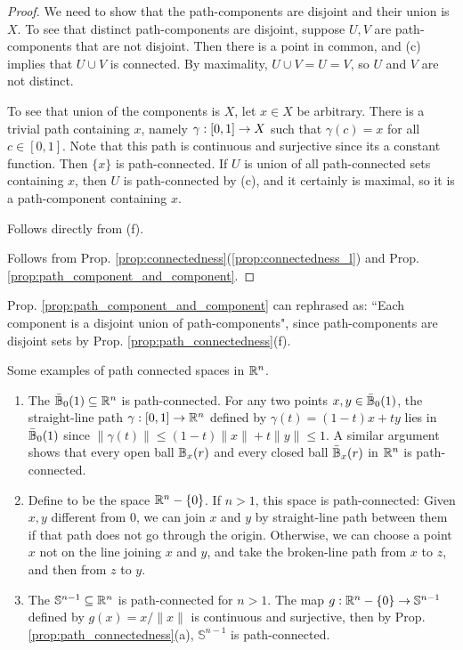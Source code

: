 \documentclass[11pt,a4paper]{article}
\begin{document}
\begin{proof}
 We need to show that the path-components are disjoint and their union is $X$. To see that distinct path-components are disjoint, suppose $U, V$ are path-components that are not disjoint. Then there is a point in common, and (c) implies that $U\cup V$ is connected. By maximality, $U\cup V = U = V$, so $U$ and $V$ are not distinct.

To see that union of the components is $X$, let $x\in X$ be arbitrary. There is a trivial path containing $x$, namely $\gamma:[0,1]\rightarrow X$ such that $\gamma(c) = x$ for all $c\in [0,1]$. Note that this path is continuous and surjective since its a constant function. Then $\{x\}$ is path-connected. If $U$ is union of all path-connected sets containing $x$, then $U$ is path-connected by (c), and it certainly is maximal, so it is a path-component containing $x$.

 Follows directly from (f).

 Follows from Prop. \ref{prop:connectedness}(\ref{prop:connectedness_l}) and Prop. \ref{prop:path_component_and_component}.
\end{proof}

\begin{remark}\label{remark:commponent_path_component}
Prop. \ref{prop:path_component_and_component} can rephrased as:
``Each component is a disjoint union of path-components", since path-components are disjoint sets by Prop. \ref{prop:path_connectedness}(f).
\end{remark}

\begin{example}
Some examples of path connected spaces in $\mathbb{R}^n$.
\begin{enumerate}
    \item The  $\bar{\mathbb{B}}_{0}(1)\subseteq \mathbb{R}^n$ is path-connected. For any two points $x,y\in \bar{\mathbb{B}}_{0}(1)$, the straight-line path $\gamma:[0,1]\rightarrow \mathbb{R}^n$ defined by $\gamma(t) = (1-t)x+ty$ lies in $\bar{\mathbb{B}}_{0}(1)$ since $\|\gamma(t)\|\le (1-t)\|x\|+t\|y\|\le 1$. A similar argument shows that every open ball $\mathbb{B}_{x}(r)$ and every closed ball $\bar{\mathbb{B}}_{x}(r)$ in $\mathbb{R}^n$ is path-connected.
    \item Define  to be the space $\mathbb{R}^n-\{0\}$. If $n>1$, this space is path-connected: Given $x,y$ different from $0$, we can join $x$ and $y$ by straight-line path between them if that path does not go through the origin. Otherwise, we can choose a point $x$ not on the line joining $x$ and $y$, and take the broken-line path from $x$ to $z$, and then from $z$ to $y$.
    \item The  $\mathbb{S}^{n-1}\subseteq \mathbb{R}^n$ is path-connected for $n>1$. The map $g:\mathbb{R}^n-\{0\}\rightarrow \mathbb{S}^{n-1}$ defined by $g(x) = x/\|x\|$ is continuous and surjective, then by Prop. \ref{prop:path_connectedness}(a), $\mathbb{S}^{n-1}$ is path-connected.
\end{enumerate}
\end{example}
\end{document}
